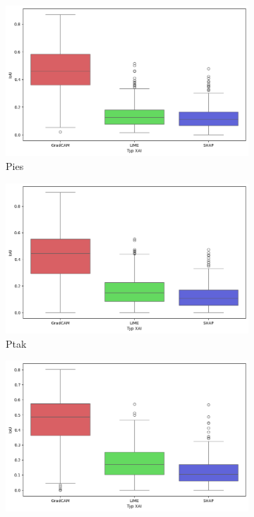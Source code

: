 \begin{figure}[h]
	\centering
	\begin{subfigure}[b]{0.3\textwidth}
		\includegraphics[width=.9\textwidth]{img/base_iou_dog}
		\caption{Pies}
	\end{subfigure}
	\begin{subfigure}[b]{0.3\textwidth}
		\centering\includegraphics[width=.9\textwidth]{img/base_iou_bird}
		\caption{Ptak}
	\end{subfigure}
	\begin{subfigure}[b]{0.3\textwidth}
		\centering\includegraphics[width=.9\textwidth]{img/base_iou_vehicle}

\end{subfigure}
\end{figure}
